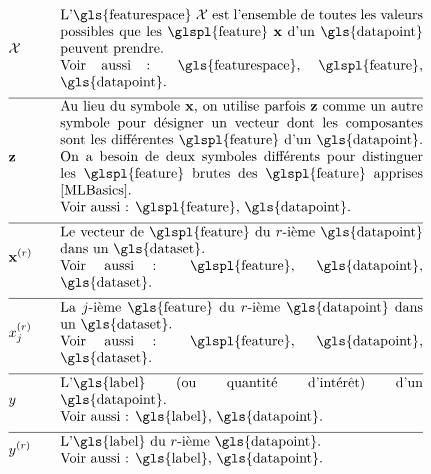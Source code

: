 \begin{align}	
	& \featurespace & \quad & \parbox{.75\textwidth}{L'\gls{featurespace} $\featurespace$ est l’ensemble de toutes les valeurs possibles que les \glspl{feature} $\featurevec$ d’un \gls{datapoint} peuvent prendre. \\ Voir aussi : \gls{featurespace}, \glspl{feature}, \gls{datapoint}.} \nonumber \\[2mm] \hline \nonumber\\[-5mm]
	& \rawfeaturevec & \quad & \parbox{.75\textwidth}{Au lieu du symbole $\featurevec$, on utilise parfois $\rawfeaturevec$ comme un autre symbole pour désigner un vecteur dont les composantes sont les différentes \glspl{feature} d’un \gls{datapoint}. On a besoin de deux symboles différents pour distinguer les \glspl{feature} brutes des \glspl{feature} apprises \cite[Ch. 9]{MLBasics}. \\ Voir aussi : \glspl{feature}, \gls{datapoint}.} \nonumber \\[2mm] \hline \nonumber\\[-5mm]
	& \featurevec^{(\sampleidx)} & \quad & \parbox{.75\textwidth}{Le vecteur de \glspl{feature} du $\sampleidx$-ième \gls{datapoint} dans un \gls{dataset}. \\ Voir aussi : \glspl{feature}, \gls{datapoint}, \gls{dataset}.} \nonumber \\[2mm] \hline \nonumber\\[-5mm]
	& \feature_{\featureidx}^{(\sampleidx)} & \quad & \parbox{.75\textwidth}{La $\featureidx$-ième \gls{feature} du $\sampleidx$-ième \gls{datapoint} dans un \gls{dataset}. \\ Voir aussi : \glspl{feature}, \gls{datapoint}, \gls{dataset}.} \nonumber  \\[2mm] \hline \nonumber\\[-5mm]
	& \truelabel & \quad & \parbox{.75\textwidth}{L'\gls{label} (ou quantité d’intérêt) d’un \gls{datapoint}. \\ Voir aussi : \gls{label}, \gls{datapoint}.} \nonumber \\[2mm] \hline \nonumber\\[-5mm]
	& \truelabel^{(\sampleidx)} & \quad & \parbox{.75\textwidth}{L'\gls{label} du $\sampleidx$-ième \gls{datapoint}. \\ Voir aussi : \gls{label}, \gls{datapoint}.} \nonumber
\end{align}

